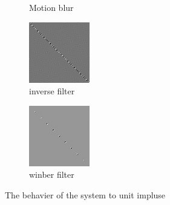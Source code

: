 \documentclass[
	12pt, %
]{style/fphw}
\begin{document}
\begin{figure}[H]
\begin{subfigure}[b]{.24\textwidth}
		\caption{Motion blur \\}
		\label{test_input_burl}
	\end{subfigure}
	\hfill
	\begin{subfigure}[b]{.24\textwidth}
		\centering
		\includegraphics[width=0.9\linewidth]{test_input_restore_abs.png}
		\caption{inverse filter}
		\label{test_input_restore_abs}
	\end{subfigure}
	\hfill
	\begin{subfigure}[b]{.24\textwidth}
		\centering
		\includegraphics[width=0.9\linewidth]{test_input_restore_winber.png}
		\caption{winber filter}
		\label{test_input_restore_winber}
	\end{subfigure}
	\caption{The behavier of the system to unit impluse}
	\label{unit impluse}	
\end{figure}
\end{document}
